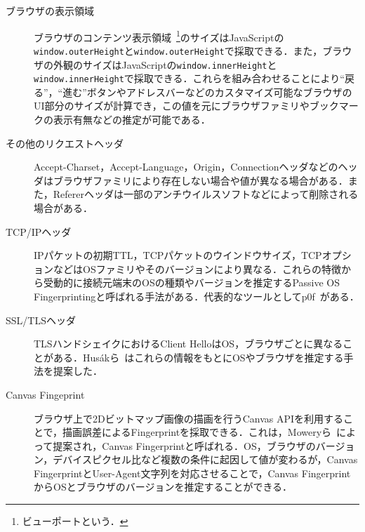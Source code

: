 \begin{description}
\item[ブラウザの表示領域]ブラウザのコンテンツ表示領域~\footnote{ビューポートという．}のサイズはJavaScriptの\texttt{window.outerHeight}と\texttt{window.outerHeight}で採取できる．また，ブラウザの外観のサイズはJavaScriptの\texttt{window.innerHeight}と\texttt{window.innerHeight}で採取できる．これらを組み合わせることにより``戻る''，``進む''ボタンやアドレスバーなどのカスタマイズ可能なブラウザのUI部分のサイズが計算でき，この値を元にブラウザファミリやブックマークの表示有無などの推定が可能である．
\item[その他のリクエストヘッダ]Accept-Charset，Accept-Language，Origin，Connectionヘッダなどのヘッダはブラウザファミリにより存在しない場合や値が異なる場合がある．また，Refererヘッダは一部のアンチウイルスソフトなどによって削除される場合がある．
\item[TCP/IPヘッダ]IPパケットの初期TTL，TCPパケットのウインドウサイズ，TCPオプションなどはOSファミリやそのバージョンにより異なる．これらの特徴から受動的に接続元端末のOSの種類やバージョンを推定するPassive OS Fingerprintingと呼ばれる手法がある．代表的なツールとしてp0f~\cite{p0f}がある．
\item[SSL/TLSヘッダ]TLSハンドシェイクにおけるClient HelloはOS，ブラウザごとに異なることがある．Hus{\'a}kら~\cite{husak2016https}はこれらの情報をもとにOSやブラウザを推定する手法を提案した．
\item[Canvas Fingeprint]ブラウザ上で2Dビットマップ画像の描画を行うCanvas APIを利用することで，描画誤差によるFingerprintを採取できる．これは，Moweryら~\cite{mowery2012pixel}によって提案され，Canvas Fingerprintと呼ばれる．OS，ブラウザのバージョン，デバイスピクセル比など複数の条件に起因して値が変わるが，Canvas FingerprintとUser-Agent文字列を対応させることで，Canvas FingerprintからOSとブラウザのバージョンを推定することができる．
\end{description}
